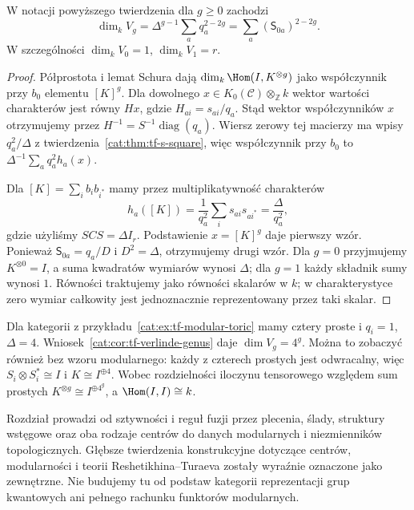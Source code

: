 \begin{wniosek}\label{cat:cor:tf-verlinde-genus}
W notacji powyższego twierdzenia dla $g\geq0$ zachodzi
\[
 \dim_k V_g=\Delta^{g-1}\sum_a q_a^{2-2g}
 =\sum_a(\mathsf S_{0a})^{2-2g}.
\]
W szczególności $\dim_k V_0=1$, $\dim_k V_1=r$.
\end{wniosek}
\begin{proof}
Półprostota i lemat Schura dają $\dim_k\Hom(I,K^{\otimes g})$ jako współczynnik przy $b_0$ elementu $[K]^g$. Dla dowolnego $x\in K_0(\mathcal C)\otimes_{\mathbb Z}k$ wektor wartości charakterów jest równy $H x$, gdzie $H_{ai}=s_{ai}/q_a$. Stąd wektor współczynników $x$ otrzymujemy przez $H^{-1}=S^{-1}\operatorname{diag}(q_a)$. Wiersz zerowy tej macierzy ma wpisy $q_a^2/\Delta$ z twierdzenia~\ref{cat:thm:tf-s-square}, więc współczynnik przy $b_0$ to $\Delta^{-1}\sum_a q_a^2 h_a(x)$.

Dla $[K]=\sum_i b_ib_{i^*}$ mamy przez multiplikatywność charakterów
\[
 h_a([K])=\frac{1}{q_a^2}\sum_i s_{ai}s_{ai^*}
 =\frac{\Delta}{q_a^2},
\]
gdzie użyliśmy $SCS=\Delta I_r$. Podstawienie $x=[K]^g$ daje pierwszy wzór. Ponieważ $\mathsf S_{0a}=q_a/D$ i $D^2=\Delta$, otrzymujemy drugi wzór. Dla $g=0$ przyjmujemy $K^{\otimes0}=I$, a suma kwadratów wymiarów wynosi $\Delta$; dla $g=1$ każdy składnik sumy wynosi $1$. Równości traktujemy jako równości skalarów w $k$; w charakterystyce zero wymiar całkowity jest jednoznacznie reprezentowany przez taki skalar.
\end{proof}

\begin{przyklad}\label{cat:ex:tf-toric-genus}
Dla kategorii z przykładu~\ref{cat:ex:tf-modular-toric} mamy cztery proste i $q_i=1$, $\Delta=4$. Wniosek~\ref{cat:cor:tf-verlinde-genus} daje $\dim V_g=4^g$. Można to zobaczyć również bez wzoru modularnego: każdy z czterech prostych jest odwracalny, więc $S_i\otimes S_i^*\cong I$ i $K\cong I^{\oplus4}$. Wobec rozdzielności iloczynu tensorowego względem sum prostych $K^{\otimes g}\cong I^{\oplus 4^g}$, a $\Hom(I,I)\cong k$.
\end{przyklad}

\begin{uwaga}\label{cat:rem:tf-scope}
Rozdział prowadzi od sztywności i reguł fuzji przez plecenia, ślady, struktury wstęgowe oraz oba rodzaje centrów do danych modularnych i niezmienników topologicznych. Głębsze twierdzenia konstrukcyjne dotyczące centrów, modularności i teorii Reshetikhina--Turaeva zostały wyraźnie oznaczone jako zewnętrzne. Nie budujemy tu od podstaw kategorii reprezentacji grup kwantowych ani pełnego rachunku funktorów modularnych.
\end{uwaga}
